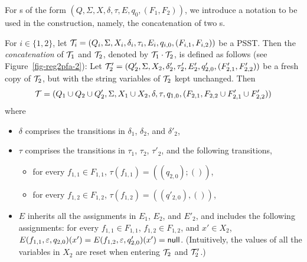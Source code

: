 For {\PSST}s of the form $(Q, \Sigma, X, \delta, \tau, E, q_0, (F_1, F_2))$, we introduce a notation to be used in the construction, namely, the concatenation of two {\PSST}s. 

\begin{definition}\label{def-psstconcat}
For $i \in \{1,2\}$, let $\mathcal{T}_i = (Q_i, \Sigma, X_i, \delta_i, \tau_i, E_i, q_{i,0}, (F_{i,1}, F_{i,2}))$ be a PSST. Then the \emph{concatenation} of $\mathcal{T}_1$ and $\mathcal{T}_2$, denoted by $\mathcal{T}_1 \cdot \mathcal{T}_2$, is defined as follows (see Figure~\ref{fig-reg2pfa-2}): 
Let  
$\mathcal{T}'_{2} = (Q'_{2}, \Sigma, X_{2}, \delta'_{2}, \tau'_{2}, E_{2}', q'_{2,0}, (F'_{2, 1}, F'_{2,2}))$ be a fresh copy of $\mathcal{T}_{2}$, but with the string variables of $\mathcal{T}_{2}$ kept unchanged. 
Then 
%
\[\mathcal{T} = ( Q_{1} \cup Q_{2} \cup Q'_{2}, \Sigma, X_1 \cup X_2, \delta, \tau, q_{1,0}, (F_{2,1}, F_{2,2} \cup F'_{2,1} \cup F'_{2,2}))\] 
where 
	\begin{itemize}
	\item $\delta$ comprises the transitions in $\delta_1$, $\delta_2$, and $\delta'_2$,
%
	\item $\tau$ comprises the transitions in $\tau_1$, $\tau_2$, $\tau'_2$, and the following transitions,
	\begin{itemize}
%
	\item for every $f_{1,1} \in F_{1,1}$, $\tau(f_{1,1}) = ((q_{2,0}); ())$, 
%
	\item for every $f_{1,2} \in F_{1,2}$, $\tau(f_{1,2}) = ((q'_{2,0}), ())$,
	\end{itemize}
	\item $E$ inherits all the assignments in $E_1$, $E_2$, and $E'_2$, and includes the following assignments:  for every $f_{1,1} \in F_{1,1}$, $f_{1,2} \in F_{1,2}$, and $x' \in X_2$, $E(f_{1,1}, \varepsilon, q_{2,0})(x') = E(f_{1,2}, \varepsilon, q'_{2,0})(x')= \mathsf{null}$. (Intuitively, the values of all the variables in $X_2$ are reset when entering $\mathcal{T}_2$ and $\mathcal{T}'_2$.)

\end{itemize}
\end{definition}
